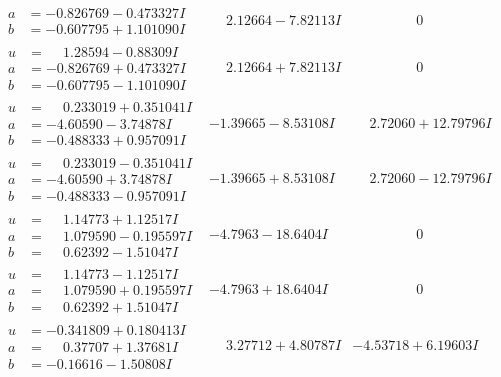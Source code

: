 \documentclass[1p]{elsarticle_modified}
\theoremstyle{definition}
\begin{document}
$$\begin{array}{c|c|c}
\begin{aligned}
a &= -0.826769 - 0.473327 I \\
b &= -0.607795 + 1.101090 I\end{aligned}
 & \phantom{-}2.12664 - 7.82113 I & \phantom{-0.000000 } 0 \\ \hline\begin{aligned}
u &= \phantom{-}1.28594 - 0.88309 I \\
a &= -0.826769 + 0.473327 I \\
b &= -0.607795 - 1.101090 I\end{aligned}
 & \phantom{-}2.12664 + 7.82113 I & \phantom{-0.000000 } 0 \\ \hline\begin{aligned}
u &= \phantom{-}0.233019 + 0.351041 I \\
a &= -4.60590 - 3.74878 I \\
b &= -0.488333 + 0.957091 I\end{aligned}
 & -1.39665 - 8.53108 I & \phantom{-}2.72060 + 12.79796 I \\ \hline\begin{aligned}
u &= \phantom{-}0.233019 - 0.351041 I \\
a &= -4.60590 + 3.74878 I \\
b &= -0.488333 - 0.957091 I\end{aligned}
 & -1.39665 + 8.53108 I & \phantom{-}2.72060 - 12.79796 I \\ \hline\begin{aligned}
u &= \phantom{-}1.14773 + 1.12517 I \\
a &= \phantom{-}1.079590 - 0.195597 I \\
b &= \phantom{-}0.62392 - 1.51047 I\end{aligned}
 & -4.7963 - 18.6404 I & \phantom{-0.000000 } 0 \\ \hline\begin{aligned}
u &= \phantom{-}1.14773 - 1.12517 I \\
a &= \phantom{-}1.079590 + 0.195597 I \\
b &= \phantom{-}0.62392 + 1.51047 I\end{aligned}
 & -4.7963 + 18.6404 I & \phantom{-0.000000 } 0 \\ \hline\begin{aligned}
u &= -0.341809 + 0.180413 I \\
a &= \phantom{-}0.37707 + 1.37681 I \\
b &= -0.16616 - 1.50808 I\end{aligned}
 & \phantom{-}3.27712 + 4.80787 I & -4.53718 + 6.19603 I \\ \hline\begin{aligned}

\end{aligned}
\end{array}$$
\end{document}
